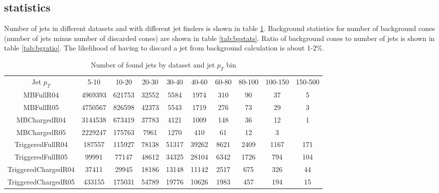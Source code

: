 \subsection{statistics}
Number of jets in different datasets and with different jet finders is shown in table \ref{tab:stats}. Background statistics for number of background cones (number of jets minus number of discarded cones) are shown in table \ref{tab:bgstats}. Ratio of background cones to number of jets is shown in table \ref{tab:bgratio}. The likelihood of having to discard a jet from background calculation is about 1-2\%.
\begin{table}[h]
\caption{Number of found jets by dataset and jet $p_T$ bin}
\tiny
\begin{tabular}{c | c | c | c | c | c | c | c | c | c}
Jet $p_T$   &     5-10 & 10-20  & 20-30 & 30-40 & 40-60 & 60-80 & 80-100 & 100-150 & 150-500 \\
MBFullR04 & 4969393 & 621753 & 32552 & 5584 & 1974 & 310 & 90 & 37 & 5 \\
MBFullR05 & 4750567 & 826598 & 42373 & 5543 & 1719 & 276 & 73 & 29 & 3 \\
MBChargedR04 & 3144538 & 673419 & 37783 & 4121 & 1009 & 148 & 36 & 12 & 1 \\
MBChargedR05 & 2229247 & 175763 & 7961 & 1270 & 410 & 61 & 12 & 3 \\
TriggeredFullR04 & 187557 & 115927 & 78138 & 51317 & 39262 & 8621 & 2409 & 1167 & 171 \\
TriggeredFullR05 & 99991 & 77147 & 48612 & 34325 & 28104 & 6342 & 1726 & 794 & 104 \\
TriggeredChargedR04 & 37411 & 29945 & 18186 & 13148 & 11142 & 2517 & 675 & 326 & 44 \\
TriggeredChargedR05 & 433155 & 175031 & 54789 & 19776 & 10626 & 1983 & 457 & 194 & 15 \\
\end{tabular}
\label{tab:stats}
\end{table}

